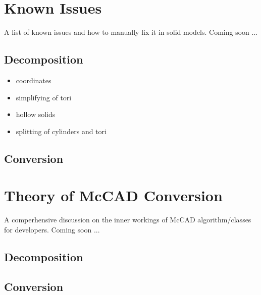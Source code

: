 \documentclass[letterpaper, 12 pt]{report}
\begin{document}
\section{Known Issues} \label{Known Issues}
A list of known issues and how to manually fix it in solid models. Coming soon ...
\subsection{Decomposition}
\begin{itemize}
	\item coordinates
	\item simplifying of tori
	\item hollow solids
	\item splitting of cylinders and tori
\end{itemize}
\subsection{Conversion}


\section{Theory of McCAD Conversion} \label{Theory of McCAD Conversion}
A comperhensive discussion on the inner workings of McCAD algorithm/classes for developers. Coming soon ...
\subsection{Decomposition}
\subsection{Conversion}
\newpage
%

\end{document}
